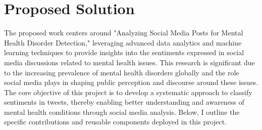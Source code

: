 
\section{Proposed Solution}
\noindent
The proposed work centers around "Analyzing Social Media Posts for Mental Health Disorder Detection," leveraging advanced data analytics and machine learning techniques to provide insights into the sentiments expressed in social media discussions related to mental health issues. This research is significant due to the increasing prevalence of mental health disorders globally and the role social media plays in shaping public perception and discourse around these issues. The core objective of this project is to develop a systematic approach to classify sentiments in tweets, thereby enabling better understanding and awareness of mental health conditions through social media analysis. Below, I outline the specific contributions and reusable components deployed in this project.

